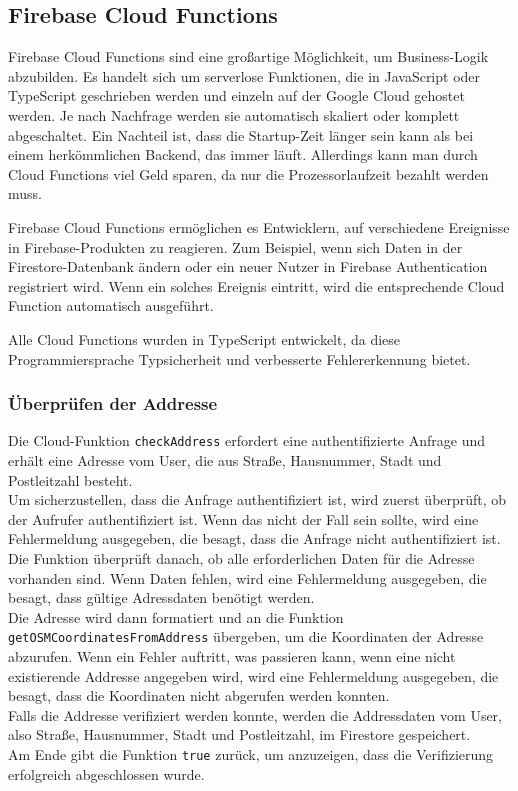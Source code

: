 \subsection{Firebase Cloud Functions}
Firebase Cloud Functions sind eine großartige Möglichkeit,
um Business-Logik abzubilden. Es handelt sich um serverlose
Funktionen, die in JavaScript oder TypeScript geschrieben
werden und einzeln auf der Google Cloud gehostet werden. Je
nach Nachfrage werden sie automatisch skaliert oder komplett
abgeschaltet. Ein Nachteil ist, dass die Startup-Zeit länger
sein kann als bei einem herkömmlichen Backend, das immer
läuft. Allerdings kann man durch Cloud Functions viel Geld
sparen, da nur die Prozessorlaufzeit bezahlt werden muss.

Firebase Cloud Functions ermöglichen es Entwicklern, auf verschiedene Ereignisse in Firebase-Produkten zu reagieren. Zum Beispiel, wenn sich Daten in der Firestore-Datenbank ändern oder ein neuer Nutzer in Firebase Authentication registriert wird. Wenn ein solches Ereignis eintritt, wird die entsprechende Cloud Function automatisch ausgeführt.

Alle Cloud Functions wurden in TypeScript entwickelt, da diese Programmiersprache Typsicherheit und verbesserte Fehlererkennung bietet.

\subsubsection{Überprüfen der Addresse}

Die Cloud-Funktion \texttt{checkAddress} erfordert eine authentifizierte Anfrage und erhält eine Adresse vom User, die aus Straße, Hausnummer, Stadt und Postleitzahl besteht.
\\
Um sicherzustellen, dass die Anfrage authentifiziert ist, wird zuerst überprüft, ob der Aufrufer authentifiziert ist. Wenn das nicht der Fall sein sollte, wird eine Fehlermeldung ausgegeben, die besagt, dass die Anfrage nicht authentifiziert ist.
\\
Die Funktion überprüft danach, ob alle erforderlichen Daten für die Adresse vorhanden sind. Wenn Daten fehlen, wird eine Fehlermeldung ausgegeben, die besagt, dass gültige Adressdaten benötigt werden.
\\
Die Adresse wird dann formatiert und an die Funktion \texttt{getOSMCoordinatesFromAddress} übergeben, um die Koordinaten der Adresse abzurufen. Wenn ein Fehler auftritt, was passieren kann, wenn eine nicht existierende Addresse angegeben wird, wird eine Fehlermeldung ausgegeben, die besagt, dass die Koordinaten nicht abgerufen werden konnten.
\\
Falls die Addresse verifiziert werden konnte, werden die Addressdaten vom User, also Straße, Hausnummer, Stadt und Postleitzahl, im Firestore gespeichert.
\\
Am Ende gibt die Funktion \texttt{true} zurück, um anzuzeigen, dass die Verifizierung erfolgreich abgeschlossen wurde.

